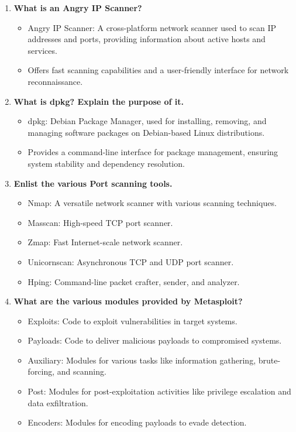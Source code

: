\documentclass[11pt]{article}
\begin{document}
\begin{enumerate}
    \item \textbf{What is an Angry IP Scanner?}
          \begin{itemize}
              \item Angry IP Scanner: A cross-platform network scanner used to scan IP addresses and ports, providing information about active hosts and services.
              \item Offers fast scanning capabilities and a user-friendly interface for network reconnaissance.
          \end{itemize}

    \item \textbf{What is dpkg? Explain the purpose of it.}
          \begin{itemize}
              \item dpkg: Debian Package Manager, used for installing, removing, and managing software packages on Debian-based Linux distributions.
              \item Provides a command-line interface for package management, ensuring system stability and dependency resolution.
          \end{itemize}

    \item \textbf{Enlist the various Port scanning tools.}
          \begin{itemize}
              \item Nmap: A versatile network scanner with various scanning techniques.
              \item Masscan: High-speed TCP port scanner.
              \item Zmap: Fast Internet-scale network scanner.
              \item Unicornscan: Asynchronous TCP and UDP port scanner.
              \item Hping: Command-line packet crafter, sender, and analyzer.
          \end{itemize}

    \item \textbf{What are the various modules provided by Metasploit?}
          \begin{itemize}
              \item Exploits: Code to exploit vulnerabilities in target systems.
              \item Payloads: Code to deliver malicious payloads to compromised systems.
              \item Auxiliary: Modules for various tasks like information gathering, brute-forcing, and scanning.
              \item Post: Modules for post-exploitation activities like privilege escalation and data exfiltration.
              \item Encoders: Modules for encoding payloads to evade detection.
          \end{itemize}
\end{enumerate}
\end{document}

